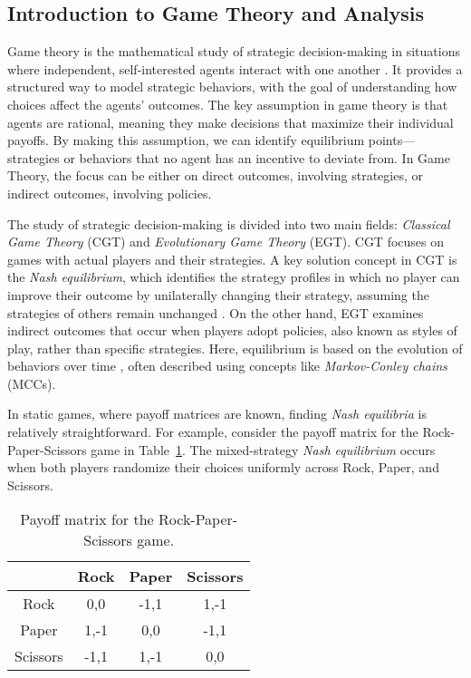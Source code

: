 \subsection{Introduction to Game Theory and Analysis}

    Game theory is the mathematical study of strategic decision-making in situations where independent, self-interested agents interact with one another \cite{Shoham_Leyton-Brown_2008}. It provides a structured way to model strategic behaviors, with the goal of understanding how choices affect the agents' outcomes. The key assumption in game theory is that agents are rational, meaning they make decisions that maximize their individual payoffs. By making this assumption, we can identify equilibrium points—strategies or behaviors that no agent has an incentive to deviate from. In Game Theory, the focus can be either on direct outcomes, involving strategies, or indirect outcomes, involving policies.\tinydouble

    \noindent
    The study of strategic decision-making is divided into two main fields: \emph{Classical Game Theory} (CGT) and \emph{Evolutionary Game Theory} (EGT). CGT focuses on games with actual players and their strategies. A key solution concept in CGT is the \emph{Nash equilibrium}, which identifies the strategy profiles in which no player can improve their outcome by unilaterally changing their strategy, assuming the strategies of others remain unchanged \cite{doi:10.1073/pnas.36.1.48}. On the other hand, EGT examines indirect outcomes that occur when players adopt policies, also known as styles of play, rather than specific strategies. Here, equilibrium is based on the evolution of behaviors over time \cite{Szab__2007}, often described using concepts like \emph{Markov-Conley chains} (MCCs).\tinydouble

    \noindent
    In static games, where payoff matrices are known, finding \emph{Nash equilibria} is relatively straightforward. For example, consider the payoff matrix for the Rock-Paper-Scissors game in Table~\ref{tab:rps_payoff}. The mixed-strategy \emph{Nash equilibrium} occurs when both players randomize their choices uniformly across Rock, Paper, and Scissors.
    \begin{table}[H]
        \centering
        \caption{Payoff matrix for the Rock-Paper-Scissors game.}
        \label{tab:rps_payoff}
        \vspace{0.5em}
        \begin{tabular}{c|c c c}
            & Rock & Paper & Scissors \\ \hline
            Rock     & 0,0    & -1,1   & 1,-1 \\
            Paper    & 1,-1   & 0,0    & -1,1 \\
            Scissors & -1,1   & 1,-1   & 0,0 \\
        \end{tabular}
    \end{table}
    
